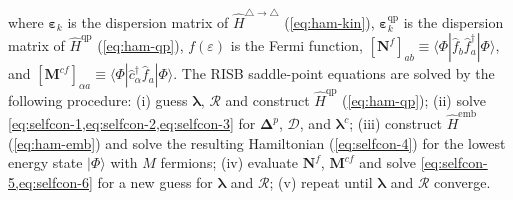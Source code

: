 \documentclass[reprint,aps,prb,amsmath,amssymb]{revtex4-2}
\begin{document}
where $\bm{\varepsilon}_k$ is the dispersion matrix of $\hat{H}^{\triangle\rightarrow \triangle}$ (\cref{eq:ham-kin}), $\bm{\varepsilon}_k^{\mathrm{qp}}$ is the dispersion matrix of $\hat{H}^{\mathrm{qp}}$ (\cref{eq:ham-qp}), $f(\varepsilon)$ is the Fermi function, $[\bm{N}^f]_{ab} \equiv \langle \Phi| \hat{f}_b^{} \hat{f}_a^{\dagger} | \Phi \rangle$, and $[\bm{M}^{cf}]_{\alpha a} \equiv \langle \Phi| \hat{c}_{\alpha}^{\dagger} \hat{f}_a^{} | \Phi \rangle$. The RISB saddle-point equations are solved by the following procedure: (i) guess $\bm{\lambda}$, $\bm{\mathcal{R}}$ and construct $\hat{H}^{\mathrm{qp}}$ (\cref{eq:ham-qp}); (ii) solve \cref{eq:selfcon-1,eq:selfcon-2,eq:selfcon-3} for $\bm{\Delta}^p$, $\bm{\mathcal{D}}$, and $\bm{\lambda}^c$; (iii) construct $\hat{H}^{\mathrm{emb}}$ (\cref{eq:ham-emb}) and solve the resulting Hamiltonian (\cref{eq:selfcon-4}) for the lowest energy state $|\Phi\rangle$ with $M$ fermions; (iv) evaluate $\bm{N}^f$, $\bm{M}^{cf}$ and solve \cref{eq:selfcon-5,eq:selfcon-6} for a new guess for $\bm{\lambda}$ and $\bm{\mathcal{R}}$; (v) repeat until $\bm{\lambda}$ and $\bm{\mathcal{R}}$ converge.
\end{document}
